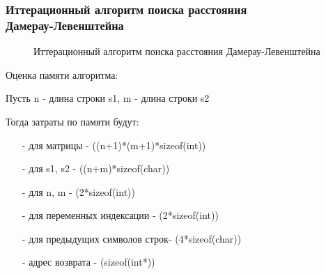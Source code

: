 \subsubsection{Иттерационный алгоритм поиска расстояния\\ Дамерау-Левенштейна}
\begin{figure}[h]
	\centering
    \def\svgscale{0.75}
	
	\label{fig:d21}
\end{figure}
\begin{figure}[h]
	\centering
    \def\svgscale{0.75}
	
	\label{fig:d22}
\end{figure}
\begin{figure}[!h]
	\centering
    \def\svgscale{0.4}
	
	\caption{Иттерационный алгоритм поиска расстояния Дамерау-Левенштейна}
	\label{fig:d23}
\end{figure}
\pagebreak
Оценка памяти алгоритма:\par
Пусть n - длина строки s1, m - длина строки s2\par
Тогда затраты по памяти будут:\par
\begin{itemize}
	\item[-] для матрицы - ((n+1)*(m+1)*sizeof(int))
	\item[-] для s1, s2 - ((n+m)*sizeof(char))
	\item[-] для n, m - (2*sizeof(int))
	\item[-] для переменных индексации - (2*sizeof(int))
	\item[-] для предыдущих символов строк- (4*sizeof(char))
	\item[-] адрес возврата - (sizeof(int*))
\end{itemize}

